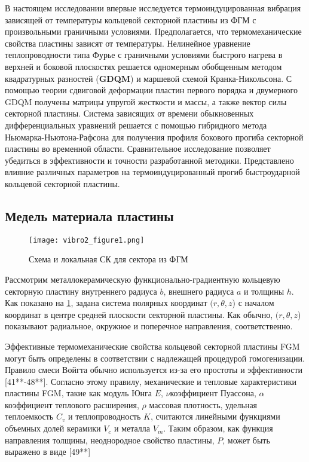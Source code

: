 В настоящем исследовании впервые исследуется термоиндуцированная вибрация зависящей от температуры кольцевой секторной пластины из ФГМ с произвольными граничными условиями. Предполагается, что термомеханические свойства пластины зависят от температуры. Нелинейное уравнение теплопроводности типа Фурье с граничными условиями быстрого нагрева в верхней и боковой плоскостях решается одномерным обобщенным методом квадратурных разностей (\textbf{GDQM}) и маршевой схемой Кранка-Никольсона. С помощью теории сдвиговой деформации пластин первого порядка и двумерного GDQM получены матрицы упругой жесткости и массы, а также вектор силы секторной пластины. Система зависящих от времени обыкновенных дифференциальных уравнений решается с помощью гибридного метода Ньюмарка-Ньютона-Рафсона для получения профиля бокового прогиба секторной пластины во временной области. Сравнительное исследование позволяет убедиться в эффективности и точности разработанной методики. Представлено влияние различных параметров на термоиндуцированный прогиб быстроударной кольцевой секторной пластины.


\subsection{Медель материала пластины}\label{ch:ch3/sec3/sub2}

\begin{figure}[h!]
	\centering
	\texttt{[image: vibro2\_figure1.png]}%
	\caption{Схема и локальная СК для сектора из ФГМ}
	\label{fig:vibro2:1}
\end{figure}

Рассмотрим металлокерамическую функционально-градиентную кольцевую секторную пластину внутреннего радиуса \(b\), внешнего радиуса \(a\) и толщины \(h\). Как показано на \cref{fig:vibro2:1}, задана система полярных координат \((r, \theta, z\)) с началом координат в центре средней плоскости секторной пластины.  Как обычно, \((r, \theta, z\)) показывают радиальное, окружное и поперечное направления, соответственно.


Эффективные термомеханические свойства кольцевой секторной пластины FGM могут быть определены в соответствии с надлежащей процедурой гомогенизации. Правило смеси Войгта обычно используется из-за его простоты и эффективности [41**-48**]. Согласно этому правилу, механические и тепловые характеристики пластины FGM, такие как модуль Юнга \(E\),  \(\nu\)коэффициент Пуассона, \(\alpha\)коэффициент теплового расширения, \(\rho\) массовая плотность, удельная теплоемкость \(C_v\) и теплопроводность \(K\), считаются линейными функциями объемных долей керамики \(V_c\) и металла \(V_m\). Таким образом, как функция направления толщины, неоднородное свойство пластины, \(P\), может быть выражено в виде [49**]

